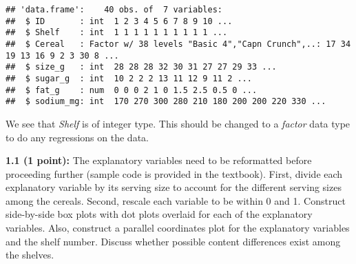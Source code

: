 \documentclass[]{article}
\newenvironment{Shaded}{\begin{snugshade}}{\end{snugshade}}
\newcommand{\CommentTok}[1]{\textcolor[rgb]{0.56,0.35,0.01}{\textit{#1}}}
\newcommand{\ControlFlowTok}[1]{\textcolor[rgb]{0.13,0.29,0.53}{\textbf{#1}}}
\newcommand{\DataTypeTok}[1]{\textcolor[rgb]{0.13,0.29,0.53}{#1}}
\newcommand{\KeywordTok}[1]{\textcolor[rgb]{0.13,0.29,0.53}{\textbf{#1}}}
\newcommand{\NormalTok}[1]{#1}
\newcommand{\OperatorTok}[1]{\textcolor[rgb]{0.81,0.36,0.00}{\textbf{#1}}}
\newcommand{\StringTok}[1]{\textcolor[rgb]{0.31,0.60,0.02}{#1}}
\begin{document}
\begin{verbatim}
## 'data.frame':    40 obs. of  7 variables:
##  $ ID       : int  1 2 3 4 5 6 7 8 9 10 ...
##  $ Shelf    : int  1 1 1 1 1 1 1 1 1 1 ...
##  $ Cereal   : Factor w/ 38 levels "Basic 4","Capn Crunch",..: 17 34 19 13 16 9 2 3 30 8 ...
##  $ size_g   : int  28 28 28 32 30 31 27 27 29 33 ...
##  $ sugar_g  : int  10 2 2 2 13 11 12 9 11 2 ...
##  $ fat_g    : num  0 0 0 2 1 0 1.5 2.5 0.5 0 ...
##  $ sodium_mg: int  170 270 300 280 210 180 200 200 220 330 ...
\end{verbatim}

We see that \emph{Shelf} is of integer type. This should be changed to a
\emph{factor} data type to do any regressions on the data.

\textbf{1.1 (1 point):} The explanatory variables need to be reformatted
before proceeding further (sample code is provided in the textbook).
First, divide each explanatory variable by its serving size to account
for the different serving sizes among the cereals. Second, rescale each
variable to be within 0 and 1. Construct side-by-side box plots with dot
plots overlaid for each of the explanatory variables. Also, construct a
parallel coordinates plot for the explanatory variables and the shelf
number. Discuss whether possible content differences exist among the
shelves.

\begin{Shaded}
\end{Shaded}
\end{document}
